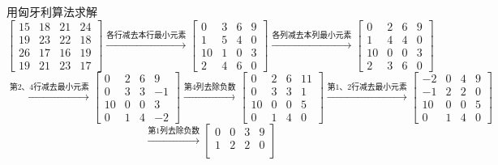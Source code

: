 \begin{solution}
    用匈牙利算法求解
    $$\begin{bmatrix}
        15 & 18 & 21 & 24\\
        19 & 23 & 22 & 18\\
        26 & 17 & 16 & 19\\
        19 & 21 & 23 & 17
    \end{bmatrix}
    \xrightarrow{\text{各行减去本行最小元素}}
    \begin{bmatrix}
        0  & 3  & 6  & 9 \\
        1  & 5  & 4  & 0 \\
        10 & 1  & 0  & 3 \\
        2  & 4  & 6  & 0
    \end{bmatrix}
    \xrightarrow{\text{各列减去本列最小元素}}
    \begin{bmatrix}
        0  & 2  & 6  & 9 \\
        1  & 4  & 4  & 0 \\
        10 & 0  & 0  & 3 \\
        2  & 3  & 6  & 0
    \end{bmatrix}$$
    $$
    \xrightarrow{\text{第2、4行减去最小元素}}
    \begin{bmatrix}
        0  & 2  & 6  & 9 \\
        0  & 3  & 3  & -1\\
        10 & 0  & 0  & 3 \\
        0  & 1  & 4  & -2
    \end{bmatrix}
    \xrightarrow{\text{第4列去除负数}}
    \begin{bmatrix}
        0  & 2  & 6  & 11\\
        0  & 3  & 3  & 1 \\
        10 & 0  & 0  & 5 \\
        0  & 1  & 4  & 0
    \end{bmatrix}
    \xrightarrow{\text{第1、2行减去最小元素}}
    \begin{bmatrix}
        -2 & 0  & 4  & 9 \\
        -1 & 2  & 2  & 0 \\
        10 & 0  & 0  & 5 \\
        0  & 1  & 4  & 0
    \end{bmatrix}$$
    $$
    \xrightarrow{\text{第1列去除负数}}
    \begin{bmatrix}
        0  & 0  & 3  & 9 \\
        1  & 2  & 2  & 0 \\

\end{bmatrix}$$
\end{solution}

